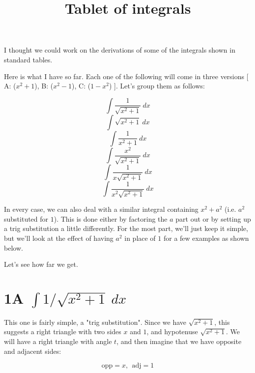\documentclass[11pt, oneside]{article}
\title{Tablet of integrals}
\date{}
\begin{document}
\maketitle
\Large


I thought we could work on the derivations of some of the integrals shown in standard tables.  

Here is what I have so far.  Each one of the following will come in three versions [ A:  ($x^2 + 1$), B:  ($x^2 - 1$), C:  ($1 - x^2$) ].  Let's group them as follows:

\begin{equation} \int \frac{1}{\sqrt{x^2 + 1}} \ dx \end{equation}
\begin{equation} \int \sqrt{x^2 + 1} \ dx \end{equation}
\begin{equation} \int \frac{1}{x^2 + 1} \ dx \end{equation}
\begin{equation} \int \frac{x^2}{\sqrt{x^2 +1}} \ dx \end{equation}
\begin{equation} \int \frac{1}{x\sqrt{x^2 + 1}} \ dx \end{equation}
\begin{equation} \int \frac{1}{x^2 \sqrt{x^2 + 1}} \ dx \end{equation}

In every case, we can also deal with a similar integral containing $x^2 + a^2$ (i.e. $a^2$ substituted for $1$).  This is done either by factoring the $a$ part out or by setting up a trig substitution a little differently.  For the most part, we'll just keep it simple, but we'll look at the effect of having $a^2$ in place of $1$  for a few examples as shown below.  

Let's see how far we get.

\section*{1A $\int 1/\sqrt{x^2 + 1} \ dx$ }

This one is fairly simple, a "trig substitution".  Since we have $\sqrt{x^2 + 1}$, this suggests a right triangle with two sides $x$ and $1$, and hypotenuse $\sqrt{x^2 + 1}$.  We will have a right triangle with angle $t$, and then imagine that we have opposite and adjacent sides:

\[ \text{opp} = x, \ \ \text{adj} = 1 \]
\end{document}
